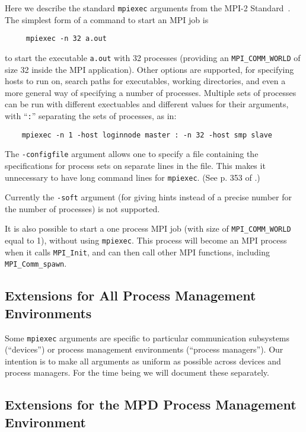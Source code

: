 \documentclass[dvipdfm,11pt]{article}
\begin{document}
Here we describe the standard \texttt{mpiexec} arguments from the MPI-2
Standard~\cite{mpi-forum:mpi2-journal}.  The simplest form of a command
to start an MPI job is 
\begin{verbatim}
     mpiexec -n 32 a.out
\end{verbatim}
to start the executable \texttt{a.out} with 32 processes (providing an
\texttt{MPI\_COMM\_WORLD} of size 32 inside the MPI application).  Other
options are supported, for specifying hosts to run on,  search paths for
executables, working directories, and even a more general way of
specifying a number of processes.  Multiple sets of processes can be run
with different exectuables and different values for their arguments,
with ``\texttt{:}'' separating the sets of processes, as in:
\begin{verbatim}
    mpiexec -n 1 -host loginnode master : -n 32 -host smp slave
\end{verbatim}
The \texttt{-configfile} argument allows one to specify a file containing the
specifications for process sets on separate lines in the file.  This
makes it unnecessary to have long command lines for \texttt{mpiexec}.  
(See p. 353 of \cite{Snir:1998:MPI2Book}.)

Currently the \texttt{-soft} argument (for giving hints instead of a
precise number for the number of processes) is not supported.

It is also possible to start a one process MPI job (with size of
\texttt{MPI\_COMM\_WORLD} equal to 1), without using \texttt{mpiexec}.
This process will become an MPI process when it calls
\texttt{MPI\_Init}, and can then call other MPI functions, including
\texttt{MPI\_Comm\_spawn}. 

\subsection{Extensions for All Process Management Environments}
\label{sec:extensions-uniform}

Some \texttt{mpiexec} arguments are specific to particular communication
subsystems (``devices'') or process management environments (``process
managers'').  Our intention is to make all arguments as uniform as
possible across devices and process managers.  For the time being we
will document these separately.

\subsection{Extensions for the MPD Process Management Environment}
\label{sec:extensions-various}
\end{document}
